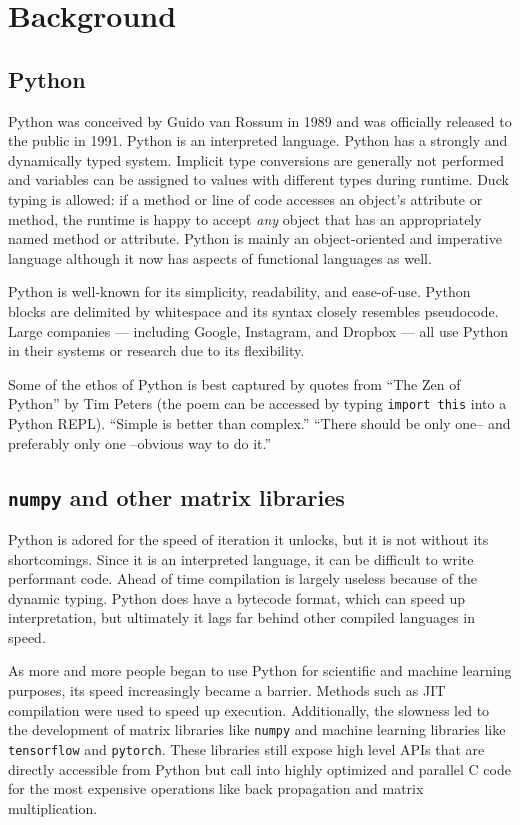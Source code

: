 \documentclass{article}
\begin{document}
\newpage

\section{Background}

\subsection{Python}

Python was conceived by Guido van Rossum in 1989 and was officially released to the public in 1991. Python is an interpreted language. Python has a strongly and dynamically typed system. Implicit type conversions are generally not performed and variables can be assigned to values with different types during runtime. Duck typing is allowed: if a method or line of code accesses an object's attribute or method, the runtime is happy to accept \textit{any} object that has an appropriately named method or attribute. Python is mainly an object-oriented and imperative language although it now has aspects of functional languages as well.

Python is well-known for its simplicity, readability, and ease-of-use. Python blocks are delimited by whitespace and its syntax closely resembles pseudocode. Large companies --- including Google, Instagram, and Dropbox --- all use Python in their systems or research due to its flexibility.

Some of the ethos of Python is best captured by quotes from ``The Zen of Python'' by Tim Peters (the poem can be accessed by typing \texttt{import this} into a Python REPL). ``Simple is better than complex.'' ``There should be only one-- and preferably only one --obvious way to do it.''

\subsection{\texttt{numpy} and other matrix libraries}

Python is adored for the speed of iteration it unlocks, but it is not without its shortcomings. Since it is an interpreted language, it can be difficult to write performant code. Ahead of time compilation is largely useless because of the dynamic typing. Python does have a bytecode format, which can speed up interpretation, but ultimately it lags far behind other  compiled languages in speed.

As more and more people began to use Python for scientific and machine learning purposes, its speed increasingly became a barrier. Methods such as JIT compilation were used to speed up execution. Additionally, the slowness led to the development of matrix libraries like \texttt{numpy} and machine learning libraries like \texttt{tensorflow} and \texttt{pytorch}. These libraries still expose high level APIs that are directly accessible from Python but call into highly optimized and parallel C code for the most expensive operations like back propagation and matrix multiplication.
\end{document}
